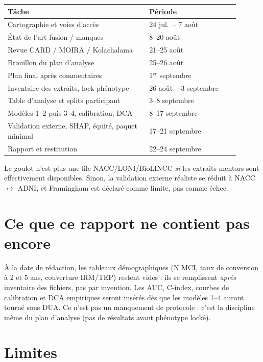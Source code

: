 \begin{center}
\begin{tabular}{p{0.55\linewidth}p{0.35\linewidth}}
\hline
\textbf{Tâche} & \textbf{Période} \\
\hline
Cartographie et voies d'accès & 24 jul.\ -- 7 août \\
État de l'art fusion / manques & 8--20 août \\
Revue CARD / MOIRA / Kolachalama & 21--25 août \\
Brouillon du plan d'analyse & 25--26 août \\
Plan final après commentaires & 1$^{\mathrm{er}}$ septembre \\
Inventaire des extraits, lock phénotype & 26 août -- 3 septembre \\
Table d'analyse et splits participant & 3--8 septembre \\
Modèles 1--2 puis 3--4, calibration, DCA & 8--17 septembre \\
Validation externe, SHAP, équité, paquet minimal & 17--21 septembre \\
Rapport et restitution & 22--24 septembre \\
\hline
\end{tabular}
\end{center}

Le goulot n'est plus une file NACC/LONI/BioLINCC \emph{si} les extraits mentors sont effectivement disponibles. Sinon, la validation externe réaliste se réduit à NACC $\leftrightarrow$ ADNI, et Framingham est déclaré comme limite, pas comme échec.

\section{Ce que ce rapport ne contient pas encore}

À la date de rédaction, les tableaux démographiques (N MCI, taux de conversion à 2 et 5 ans, couverture IRM/TEP) restent vides : ils se remplissent \emph{après} inventaire des fichiers, pas par invention. Les AUC, C-index, courbes de calibration et \ac{DCA} empiriques seront insérés dès que les modèles 1--4 auront tourné sous DUA. Ce n'est pas un manquement de protocole : c'est la discipline même du plan d'analyse (pas de résultats avant phénotype locké).

\section{Limites}

